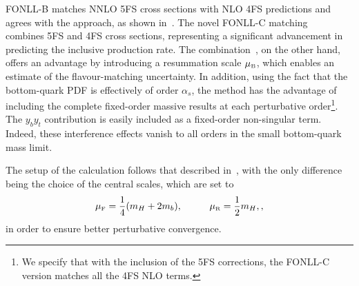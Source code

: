 \documentclass[11pt,a4paper]{article}
\begin{document}
FONLL-B matches NNLO 5FS cross sections with NLO 4FS predictions and agrees with the \nlonnllpart{} approach, as shown in~. The novel FONLL-C matching~\cite{Duhr:2020kzd} combines \fnnnlo{} 5FS and \fnlo{} 4FS cross sections, representing a significant advancement in predicting the \bbH{} inclusive production rate. The \nlonnllpart{} combination~\cite{Bonvini:2016fgf}, on the other hand, offers an advantage by introducing a resummation scale $\muB$, which enables an estimate of the flavour-matching uncertainty. In addition, using the fact that the bottom-quark PDF is effectively of order $\alpha_s$, the method has the advantage of including the complete fixed-order massive results at each perturbative order\footnote{We specify that with the inclusion of the \fnnnlo{} 5FS corrections, the FONLL-C version matches all the 4FS NLO terms.}. The $y_by_t$  contribution is easily included as a fixed-order non-singular term. Indeed, these interference effects vanish to all orders in the small bottom-quark mass limit.

The setup of the calculation follows that described in~, with the only difference being the choice of the central scales, which are set to
\begin{align}
\muF=\frac{1}{4}(m_H+2m_b),\hspace{1cm}\muR=\frac{1}{2}m_H,,
\end{align}
in order to ensure better perturbative convergence.
\end{document}
